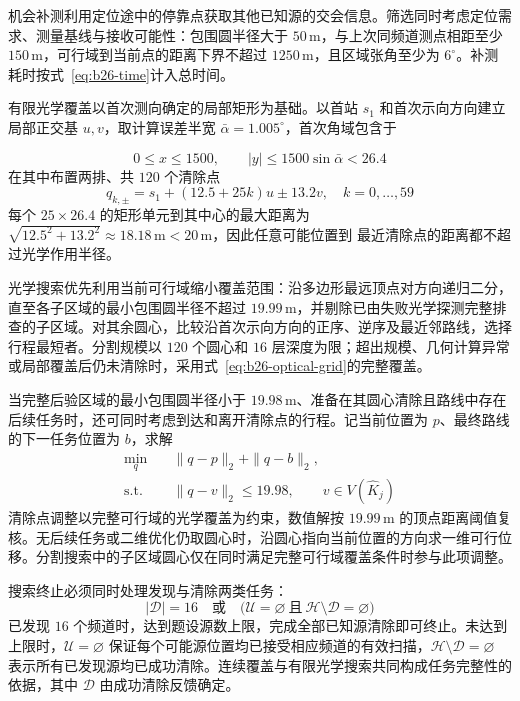 \documentclass[withoutpreface,bwprint]{cumcmthesis} %
\begin{document}
机会补测利用定位途中的停靠点获取其他已知源的交会信息。筛选同时考虑定位需求、测量基线与接收可能性：包围圆半径大于 $50\,\mathrm m$，与上次同频道测点相距至少 $150\,\mathrm m$，可行域到当前点的距离下界不超过 $1250\,\mathrm m$，且区域张角至少为 $6^\circ$。补测耗时按式~\eqref{eq:b26-time}计入总时间。

有限光学覆盖以首次测向确定的局部矩形为基础。以首站 $s_1$ 和首次示向方向建立局部正交基 $u,v$，取计算误差半宽 $\bar\alpha=1.005^\circ$，首次角域包含于

\begin{equation}
 0\leq x\leq1500,\qquad |y|\leq1500\sin\bar\alpha<26.4
 \label{eq:b26-optical-strip}
\end{equation}
在其中布置两排、共 $120$ 个清除点
\begin{equation}
 q_{k,\pm}=s_1+(12.5+25k)u\pm13.2v,\quad k=0,\ldots,59
 \label{eq:b26-optical-grid}
\end{equation}
每个 $25\times26.4$ 的矩形单元到其中心的最大距离为
$\sqrt{12.5^2+13.2^2}\approx18.18\,\mathrm m<20\,\mathrm m$，因此任意可能位置到
最近清除点的距离都不超过光学作用半径。

光学搜索优先利用当前可行域缩小覆盖范围：沿多边形最远顶点对方向递归二分，直至各子区域的最小包围圆半径不超过 $19.99\,\mathrm m$，并剔除已由失败光学探测完整排查的子区域。对其余圆心，比较沿首次示向方向的正序、逆序及最近邻路线，选择行程最短者。分割规模以 $120$ 个圆心和 $16$ 层深度为限；超出规模、几何计算异常或局部覆盖后仍未清除时，采用式~\eqref{eq:b26-optical-grid}的完整覆盖。

当完整后验区域的最小包围圆半径小于 $19.98\,\mathrm m$、准备在其圆心清除且路线中存在后续任务时，还可同时考虑到达和离开清除点的行程。记当前位置为 $p$、最终路线的下一任务位置为 $b$，求解
\begin{equation}
 \begin{aligned}
 \min_q\quad&\|q-p\|_2+\|q-b\|_2,\\
 \text{s.t.}\quad&\|q-v\|_2\leq19.98,\qquad v\in V(\widehat K_j)
 \end{aligned}
 \label{eq:b26-q3-clear-route}
\end{equation}
清除点调整以完整可行域的光学覆盖为约束，数值解按 $19.99\,\mathrm m$ 的顶点距离阈值复核。无后续任务或二维优化仍取圆心时，沿圆心指向当前位置的方向求一维可行位移。分割搜索中的子区域圆心仅在同时满足完整可行域覆盖条件时参与此项调整。


搜索终止必须同时处理发现与清除两类任务：
\begin{equation}
 |\mathcal D|=16
 \quad\text{或}\quad
 \bigl(\mathcal U=\varnothing\ \text{且}\ \mathcal H\setminus\mathcal D=\varnothing\bigr)
 \label{eq:b26-stop}
\end{equation}
已发现 $16$ 个频道时，达到题设源数上限，完成全部已知源清除即可终止。未达到上限时，$\mathcal U=\varnothing$ 保证每个可能源位置均已接受相应频道的有效扫描，$\mathcal H\setminus\mathcal D=\varnothing$ 表示所有已发现源均已成功清除。连续覆盖与有限光学搜索共同构成任务完整性的依据，其中 $\mathcal D$ 由成功清除反馈确定。
\end{document}
